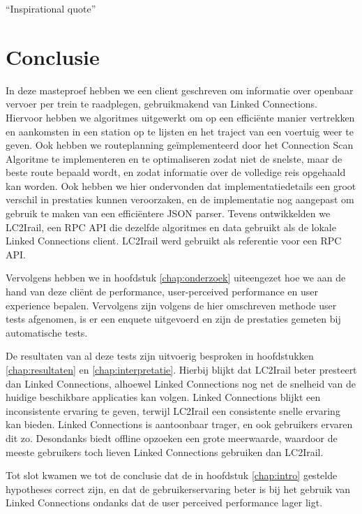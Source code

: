 \begin{savequote}[0.55\linewidth]
	``Inspirational quote''
\end{savequote}

\chapter{Conclusie}

In deze masteproef hebben we een client geschreven om informatie over openbaar vervoer per trein te raadplegen, gebruikmakend van Linked Connections. Hiervoor hebben we algoritmes uitgewerkt om op een efficiënte manier vertrekken en aankomsten in een station op te lijsten en het traject van een voertuig weer te geven. Ook hebben we routeplanning geïmplementeerd door het Connection Scan Algoritme te implementeren en te optimaliseren zodat niet de snelste, maar de beste route bepaald wordt, en zodat informatie over de volledige reis opgehaald kan worden. Ook hebben we hier ondervonden dat implementatiedetails een groot verschil in prestaties kunnen veroorzaken, en de implementatie nog aangepast om gebruik te maken van een efficiëntere JSON parser. Tevens ontwikkelden we LC2Irail, een RPC API die dezelfde algoritmes en data gebruikt als de lokale Linked Connections client. LC2Irail werd gebruikt als referentie voor een RPC API.

Vervolgens hebben we in hoofdstuk \ref{chap:onderzoek} uiteengezet hoe we aan de hand van deze cliënt de performance, user-perceived performance en user experience bepalen. Vervolgens zijn volgens de hier omschreven methode user tests afgenomen, is er een enquete uitgevoerd en zijn de prestaties gemeten bij automatische tests. 

De resultaten van al deze tests zijn uitvoerig besproken in hoofdstukken \ref{chap:resultaten} en \ref{chap:interpretatie}. Hierbij blijkt dat LC2Irail beter presteert dan Linked Connections, alhoewel Linked Connections nog net de snelheid van de huidige beschikbare applicaties kan volgen. Linked Connections blijkt een inconsistente ervaring te geven, terwijl LC2Irail een consistente snelle ervaring kan bieden. Linked Connections is aantoonbaar trager, en ook gebruikers ervaren dit zo. Desondanks biedt offline opzoeken een grote meerwaarde, waardoor de meeste gebruikers toch lieven Linked Connections gebruiken dan LC2Irail.

Tot slot kwamen we tot de conclusie dat de in hoofdstuk \ref{chap:intro} gestelde hypotheses correct zijn, en dat de gebruikerservaring beter is bij het gebruik van Linked Connections ondanks dat de user perceived performance lager ligt.
